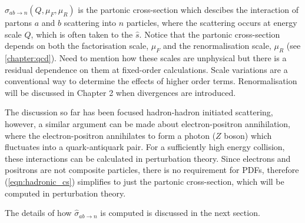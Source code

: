 \documentclass[main.tex]{subfiles}
\begin{document}
    $\hat{\sigma}_{ab \rightarrow n}(Q, \mu_{F}, \mu_{R})$
    is the partonic cross-section which descibes the interaction of
    partons $a$ and $b$ scattering into $n$ particles,
    where the scattering occurs at energy scale $Q$,
    which is often taken to the $\hat{s}$.
    Notice that the partonic cross-section depends on
    both the factorisation scale, $\mu_{F}$ and
    the renormalisation scale, $\mu_{R}$
    (see \ref{chapter:qcd}).
    {\color{red} Need to mention how these scales
    are unphysical but there is a residual dependence
    on them at fixed-order calculations. Scale
    variations are a conventional way to determine
    the effects of higher order terms.
    Renormalisation will be discussed in Chapter 2
    when divergences are introduced.}

    The discussion so far has been focused hadron-hadron
    initiated scattering, however, a similar argument
    can be made about electron-positron annihilation,
    where the electron-positron annihilates to form a
    photon ($Z$ boson) which fluctuates into a quark-antiquark
    pair. For a sufficiently high energy collision,
    these interactions can be calculated in perturbation
    theory.
    Since electrons and positrons are not composite
    particles, there is no requirement for PDFs,
    therefore (\ref{eqn:hadronic_cs}) simplifies
    to just the partonic cross-section, which
    will be computed in perturbation theory.
    
    The details of how $\hat{\sigma}_{ab \rightarrow n}$
    is computed is discussed in the next section.
\end{document}
